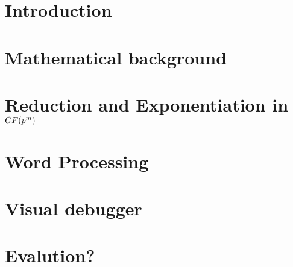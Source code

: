 \documentclass{ufscThesis}
\begin{document}
\capa  
\folhaderosto %
\folhaaprovacao
\paginaresumo
\paginaabstract
\listadefiguras
\listadetabelas 
\listadeabreviaturas
\listadesimbolos
\sumario

\chapter{Introduction}


\chapter{Mathematical background}\label{cap:background}


\chapter{Reduction and Exponentiation in $GF(\MakeLowercase{p}^\MakeLowercase{m})$}


\chapter{Word Processing}


\chapter{Visual debugger}


\chapter{Evalution?}


\end{document}
